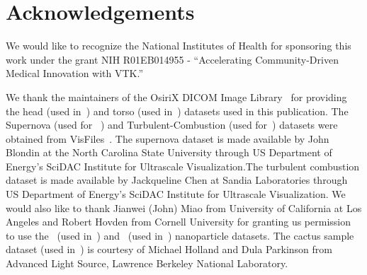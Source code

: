 \section{Acknowledgements}
\label{acknowledgements}
We would like to recognize the National Institutes of Health for sponsoring this
work under the grant NIH R01EB014955 - ``Accelerating Community-Driven Medical
Innovation with VTK.'' 

We thank the maintainers of the OsiriX DICOM Image
Library~\citep{osirix_osirix_2017} for providing the head (used
in~) and torso (used in~) datasets used in this publication. The
Supernova (used for ~) and Turbulent-Combustion (used
for~) datasets were obtained from
VisFiles~\citep{visfiles_visfiles_2007}. The supernova dataset is made available
by John Blondin at the North Carolina State University through US Department
of Energy's SciDAC Institute for Ultrascale Visualization.The turbulent
combustion dataset is made available by Jackqueline Chen at Sandia
Laboratories through US Department of Energy's SciDAC Institute for Ultrascale
Visualization. We would also like to thank Jianwei (John) Miao from University
of California at Los Angeles and Robert Hovden from Cornell University for
granting us permission to use the~ (used in~)
and~ (used in~) nanoparticle datasets. The
cactus sample dataset (used in~) is courtesy of Michael
Holland and Dula Parkinson from Advanced Light Source, Lawrence Berkeley National
Laboratory.


